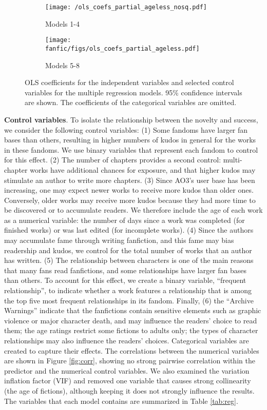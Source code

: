 \documentclass[letterpaper]{article} %
\begin{document}
\begin{figure*}[h]
    \centering
    \begin{subfigure}{\textwidth}
          \texttt{[image: /ols\_coefs\_partial\_ageless\_nosq.pdf]}
  		\caption{Models 1-4} 
			\label{fig:ols_partial_nosq}
       \end{subfigure}
      \begin{subfigure}{\textwidth}
          \texttt{[image: fanfic/figs/ols\_coefs\_partial\_ageless.pdf]}
		\caption{Models 5-8} 
		\label{fig:ols_partial}
       \end{subfigure}
           	\caption{OLS coefficients for the independent variables and selected control variables for the multiple regression models. 95\% confidence intervals are shown. The coefficients of the categorical variables are omitted.}
        \label{fig:ols}
\end{figure*}


\textbf{Control variables}.   To isolate the relationship between the novelty and success, we consider the following control variables: (1) Some fandoms have larger fan bases than others, resulting in higher numbers of kudos in general for the works in these fandoms. We use binary variables that represent each fandom to control for this effect. (2) The number of chapters provides a second control: multi-chapter works have additional chances for exposure, and that higher kudos may stimulate an author to write more chapters. (3) Since AO3's user base has been increasing, one may expect newer works to receive more kudos than older ones. Conversely, older works may receive more kudos because they had more time to be discovered or to accumulate readers. We therefore include the age of each work as a numerical variable: the number of days since a work was completed (for finished works) or was last edited (for incomplete works). (4) Since the authors may accumulate fame through writing fanfiction, and this fame may bias readership and kudos,  we control for the total number of works that an author has written. (5) The relationship between characters is one of the main reasons that many fans read fanfictions, and some relationships have larger fan bases than others. To account for this effect, we create a binary variable, ``frequent relationship'', to indicate whether a work features a relationship that is among the top five most frequent relationships in its fandom. Finally, (6) the ``Archive Warnings'' indicate that the fanfictions contain sensitive elements such as graphic violence or major character death, and may influence the readers' choice to read them; the age ratings restrict some fictions to adults only; the types of character relationships may also influence the readers' choices. Categorical variables are created to capture their effects. The correlations between the numerical variables are shown in Figure \ref{fig:corr}, showing no strong pairwise correlation within the predictor and the numerical control variables. We also examined the variation inflation factor (VIF) and removed one variable that causes strong collinearity (the age of fictions), although keeping it does not strongly influence the results. The variables that each model contains are summarized in Table \ref{tab:reg}.
\end{document}
